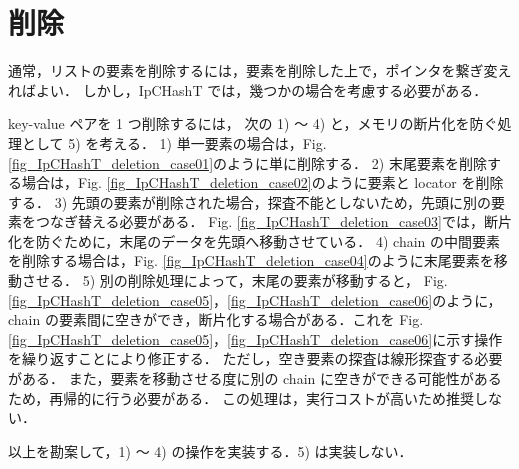 

\section{削除}

通常，リストの要素を削除するには，要素を削除した上で，ポインタを繋ぎ変えればよい．
しかし，IpCHashT では，幾つかの場合を考慮する必要がある．

key-value ペアを 1 つ削除するには，
次の 1) 〜 4) と，メモリの断片化を防ぐ処理として 5) を考える．
1) 単一要素の場合は，Fig. \ref{fig_IpCHashT_deletion_case01}のように単に削除する．
2) 末尾要素を削除する場合は，Fig. \ref{fig_IpCHashT_deletion_case02}のように要素と locator を削除する．
3) 先頭の要素が削除された場合，探査不能としないため，先頭に別の要素をつなぎ替える必要がある．
Fig. \ref{fig_IpCHashT_deletion_case03}では，断片化を防ぐために，末尾のデータを先頭へ移動させている．
4) chain の中間要素を削除する場合は，Fig. \ref{fig_IpCHashT_deletion_case04}のように末尾要素を移動させる．
5) 別の削除処理によって，末尾の要素が移動すると，
Fig. \ref{fig_IpCHashT_deletion_case05}，\ref{fig_IpCHashT_deletion_case06}のように，
chain の要素間に空きができ，断片化する場合がある．これを
Fig. \ref{fig_IpCHashT_deletion_case05}，\ref{fig_IpCHashT_deletion_case06}に示す操作を繰り返すことにより修正する．
ただし，空き要素の探査は線形探査する必要がある．
また，要素を移動させる度に別の chain に空きができる可能性があるため，再帰的に行う必要がある．
この処理は，実行コストが高いため推奨しない．

以上を勘案して，1) 〜 4) の操作を実装する．5) は実装しない．

